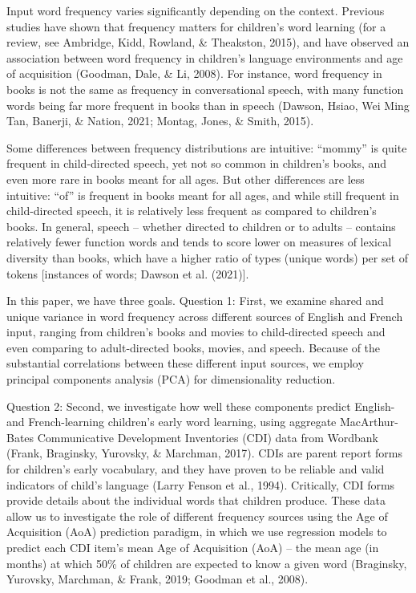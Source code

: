 \documentclass[10pt, letterpaper]{article}
\begin{document}
Input word frequency varies significantly depending on the context.
Previous studies have shown that frequency matters for children's word
learning (for a review, see Ambridge, Kidd, Rowland, \& Theakston,
2015), and have observed an association between word frequency in
children's language environments and age of acquisition (Goodman, Dale,
\& Li, 2008). For instance, word frequency in books is not the same as
frequency in conversational speech, with many function words being far
more frequent in books than in speech (Dawson, Hsiao, Wei Ming Tan,
Banerji, \& Nation, 2021; Montag, Jones, \& Smith, 2015).

Some differences between frequency distributions are intuitive:
``mommy'' is quite frequent in child-directed speech, yet not so common
in children's books, and even more rare in books meant for all ages. But
other differences are less intuitive: ``of'' is frequent in books meant
for all ages, and while still frequent in child-directed speech, it is
relatively less frequent as compared to children's books. In general,
speech -- whether directed to children or to adults -- contains
relatively fewer function words and tends to score lower on measures of
lexical diversity than books, which have a higher ratio of types (unique
words) per set of tokens {[}instances of words; Dawson et al. (2021){]}.

In this paper, we have three goals. Question 1: First, we examine shared
and unique variance in word frequency across different sources of
English and French input, ranging from children's books and movies to
child-directed speech and even comparing to adult-directed books,
movies, and speech. Because of the substantial correlations between
these different input sources, we employ principal components analysis
(PCA) for dimensionality reduction.

Question 2: Second, we investigate how well these components predict
English- and French-learning children's early word learning, using
aggregate MacArthur-Bates Communicative Development Inventories (CDI)
data from Wordbank (Frank, Braginsky, Yurovsky, \& Marchman, 2017). CDIs
are parent report forms for children's early vocabulary, and they have
proven to be reliable and valid indicators of child's language (Larry
Fenson et al., 1994). Critically, CDI forms provide details about the
individual words that children produce. These data allow us to
investigate the role of different frequency sources using the Age of
Acquisition (AoA) prediction paradigm, in which we use regression models
to predict each CDI item's mean Age of Acquisition (AoA) -- the mean age
(in months) at which 50\% of children are expected to know a given word
(Braginsky, Yurovsky, Marchman, \& Frank, 2019; Goodman et al., 2008).
\end{document}
